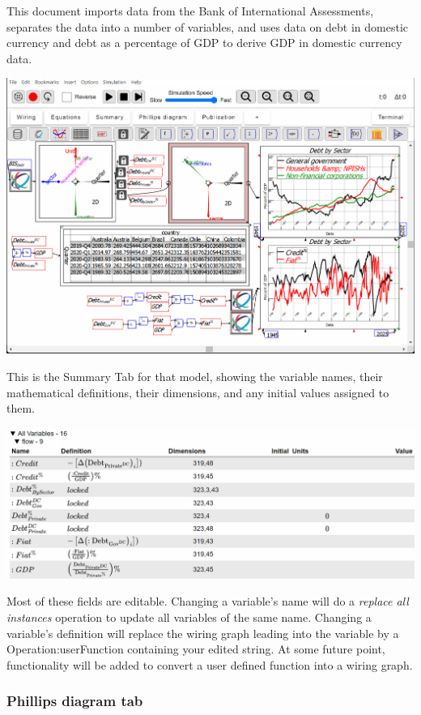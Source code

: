 This document imports data from the Bank of International Assessments,
separates the data into a number of variables, and uses data on debt
in domestic currency and debt as a percentage of GDP to derive GDP
in domestic currency data.

\noindent\includegraphics[width=\textwidth]{images/DebtCalcGDPexample}

This is the Summary Tab for that model, showing the variable names,
their mathematical definitions, their dimensions, and any initial
values assigned to them.

\noindent\includegraphics[width=\textwidth]{images/DebtCalcGDPexampleSummaryTab}

Most of these fields are editable. Changing a variable's name will
do a \emph{replace all instances} operation to update all variables
of the same name. Changing a variable's definition will replace the
wiring graph leading into the variable by a 
{Operation:userFunction} containing your edited string. At some
future point, functionality will be added to convert a user defined
function into a wiring graph.

\subsubsection{Phillips diagram tab}

